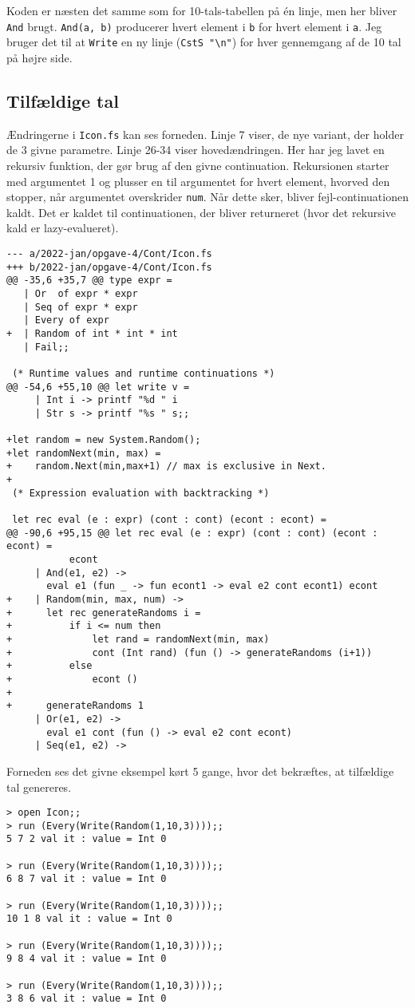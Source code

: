 Koden er næsten det samme som for 10-tals-tabellen på én linje, men her bliver \texttt{And} brugt. \texttt{And(a, b)} producerer hvert element i \texttt{b} for hvert element i \texttt{a}. Jeg bruger det til at \texttt{Write} en ny linje (\texttt{CstS "\textbackslash n"}) for hver gennemgang af de 10 tal på højre side.

\subsection{Tilfældige tal}

Ændringerne i \texttt{Icon.fs} kan ses forneden. Linje 7 viser, de nye variant, der holder de 3 givne parametre. Linje 26-34 viser hovedændringen. Her har jeg lavet en rekursiv funktion, der gør brug af den givne continuation. Rekursionen starter med argumentet 1 og plusser en til argumentet for hvert element, hvorved den stopper, når argumentet overskrider \texttt{num}. Når dette sker, bliver fejl-continuationen kaldt. Det er kaldet til continuationen, der bliver returneret (hvor det rekursive kald er lazy-evalueret).

\begin{verbatim}
--- a/2022-jan/opgave-4/Cont/Icon.fs
+++ b/2022-jan/opgave-4/Cont/Icon.fs
@@ -35,6 +35,7 @@ type expr =
   | Or  of expr * expr
   | Seq of expr * expr
   | Every of expr 
+  | Random of int * int * int
   | Fail;;
 
 (* Runtime values and runtime continuations *)
@@ -54,6 +55,10 @@ let write v =
     | Int i -> printf "%d " i
     | Str s -> printf "%s " s;;
 
+let random = new System.Random();
+let randomNext(min, max) =
+    random.Next(min,max+1) // max is exclusive in Next.
+
 (* Expression evaluation with backtracking *)
 
 let rec eval (e : expr) (cont : cont) (econt : econt) = 
@@ -90,6 +95,15 @@ let rec eval (e : expr) (cont : cont) (econt : econt) =
           econt
     | And(e1, e2) -> 
       eval e1 (fun _ -> fun econt1 -> eval e2 cont econt1) econt
+    | Random(min, max, num) ->
+      let rec generateRandoms i =
+          if i <= num then
+              let rand = randomNext(min, max)
+              cont (Int rand) (fun () -> generateRandoms (i+1))
+          else
+              econt ()
+
+      generateRandoms 1
     | Or(e1, e2) -> 
       eval e1 cont (fun () -> eval e2 cont econt)
     | Seq(e1, e2) -> 
\end{verbatim}

Forneden ses det givne eksempel kørt 5 gange, hvor det bekræftes, at tilfældige tal genereres.

\begin{verbatim}
> open Icon;;
> run (Every(Write(Random(1,10,3))));;
5 7 2 val it : value = Int 0

> run (Every(Write(Random(1,10,3))));;
6 8 7 val it : value = Int 0

> run (Every(Write(Random(1,10,3))));;
10 1 8 val it : value = Int 0

> run (Every(Write(Random(1,10,3))));;
9 8 4 val it : value = Int 0

> run (Every(Write(Random(1,10,3))));;
3 8 6 val it : value = Int 0
\end{verbatim}

